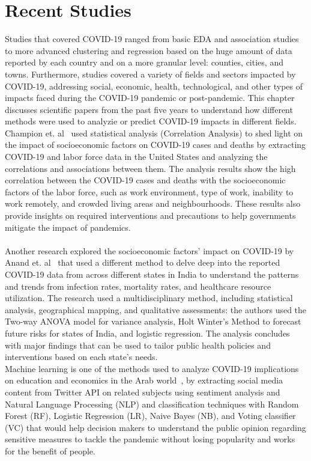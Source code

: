 \documentclass[a4paper]{report}
\begin{document}
\chapter{Recent Studies}\label{ch2:recent-studies}

Studies that covered COVID-19 ranged from basic EDA and association studies to more advanced clustering and regression based on the huge amount of data reported by each country and on a more granular level: counties, cities, and towns. Furthermore, studies covered a variety of fields and sectors impacted by COVID-19, addressing social, economic, health, technological, and other types of impacts faced during the COVID-19 pandemic or post-pandemic. This chapter discusses scientific papers from the past five years to understand how different methods were used to analyzie or predict COVID-19 impacts in different fields.
\\


Champion et. al~\cite{10487417} used statistical analysis (Correlation Analysis) to shed light on the impact of socioeconomic factors on COVID-19 cases and deaths by extracting COVID-19 and labor force data in the United States and analyzing the correlations and associations between them. The analysis results show the high correlation between the COVID-19 cases and deaths with the socioeconomic factors of the labor force, such as work environment, type of work, inability to work remotely, and crowded living areas and neighbourhoods. These results also provide insights on required interventions and precautions to help governments mitigate the impact of pandemics. 
\\
\\
Another research explored the socioeconomic factors' impact on COVID-19 by Anand et. al~\cite{10840438} that used a different method to delve deep into the reported COVID-19 data from across different states in India to understand the patterns and trends from infection rates, mortality rates, and healthcare resource utilization. The research used a multidisciplinary method, including statistical analysis, geographical mapping, and qualitative assessments: the authors used the Two-way ANOVA model for variance analysis, Holt Winter's Method to forecast future risks for states of India, and logistic regression. The analysis concludes with major findings that can be used to tailor public health policies and interventions based on each state's needs.
\\

Machine learning is one of the methods used to analyze COVID-19 implications on education and economics in the Arab world~\cite{9811166}, by extracting social media content from Twitter API on related subjects using sentiment analysis and Natural Language Processing (NLP) and classification techniques with Random Forest (RF), Logistic Regression (LR), Naive Bayes (NB), and Voting classifier (VC) that would help decision makers to understand the public opinion regarding sensitive measures to tackle the pandemic without losing popularity and works for the benefit of people. 
\newline
\newline
\end{document}
